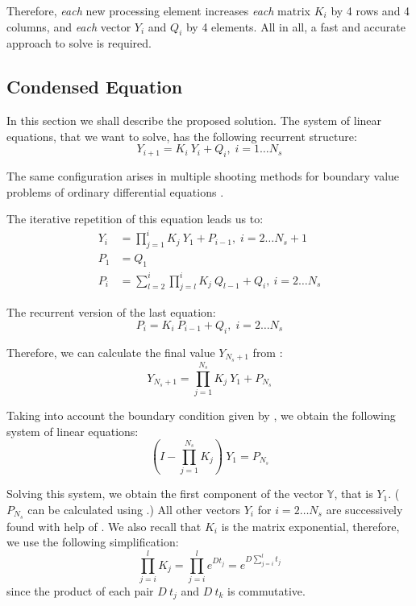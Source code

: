 Therefore, \emph{each} new processing element increases \emph{each} matrix $K_i$ by 4 rows and 4 columns, and \emph{each} vector $Y_i$ and $Q_i$ by 4 elements. All in all, a fast and accurate approach to solve  is required.

\subsection{Condensed Equation}
In this section we shall describe the proposed solution. The system of linear equations, that we want to solve, has the following recurrent structure:
\begin{equation} \label{eq:ce-recurrent}
  Y_{i + 1} = K_i \: Y_i + Q_i, \; i = 1 \dots N_s
\end{equation}

The same configuration arises in multiple shooting methods for boundary value problems of ordinary differential equations \cite{stoer2002}.

The iterative repetition of this equation leads us to:
\begin{align}
  Y_i & = \prod_{j = 1}^{i} K_j \: Y_1 + P_{i - 1}, \; i = 2 \dots N_s + 1 \label{eq:y-recurrent} \\
  P_1 & = Q_1 \nonumber \\
  P_i & = \sum_{l = 2}^i \prod_{j = l}^i K_j \: Q_{l - 1} + Q_i, \: i = 2 \dots N_s \nonumber
\end{align}

The recurrent version of the last equation:
\begin{equation} \label{eq:p-recurrent}
  P_i = K_i \: P_{i - 1} + Q_i, \; i = 2 \dots N_s
\end{equation}

Therefore, we can calculate the final value $Y_{N_s + 1}$ from :
\[
  Y_{N_s + 1} = \prod_{j = 1}^{N_s} K_j \: Y_1 + P_{N_s}
\]

Taking into account the boundary condition given by , we obtain the following system of linear equations:
\[
  (I - \prod_{j = 1}^{N_s} K_j) \: Y_1 = P_{N_s}
\]

Solving this system, we obtain the first component of the vector $\mathbb{Y}$, that is $Y_1$. ($P_{N_s}$ can be calculated using .) All other vectors $Y_i$ for $i = 2 \dots N_s$ are successively found with help of . We also recall that $K_i$ is the matrix exponential, therefore, we use the following simplification:
\[
  \prod_{j = i}^l K_j = \prod_{j = i}^l e^{D t_j} = e^{D \sum_{j = i}^l t_j}
\]
since the product of each pair $D \: t_j$ and $D \: t_k$ is commutative.

